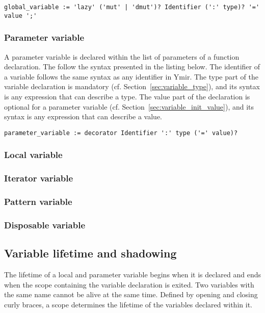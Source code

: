 \begin{lstlisting}[style=intermediateVerb]
global_variable := 'lazy' ('mut' | 'dmut')? Identifier (':' type)? '=' value ';'
\end{lstlisting}

\subsubsection*{Parameter variable}

A parameter variable is declared within the list of parameters of a function
declaration. The follow the syntax presented in the listing below. The
identifier of a variable follows the same syntax as any identifier in Ymir. The
type part of the variable declaration is mandatory (cf.
Section~\ref{sec:variable_type}), and its syntax is any expression that can
describe a type. The value part of the declaration is optional for a parameter
variable (cf. Section~\ref{sec:variable_init_value}), and its syntax is any
expression that can describe a value.

\begin{lstlisting}[style=intermediateVerb]
parameter_variable := decorator Identifier ':' type ('=' value)?
\end{lstlisting}

\subsubsection*{Local variable}
\subsubsection*{Iterator variable}
\subsubsection*{Pattern variable}
\subsubsection*{Disposable variable}

\subsection{Variable lifetime and shadowing}

The lifetime of a local and parameter variable begins when it is declared and
ends when the scope containing the variable declaration is exited. Two variables
with the same name cannot be alive at the same time. Defined by opening and
closing curly braces, a scope determines the lifetime of the variables declared
within it.

